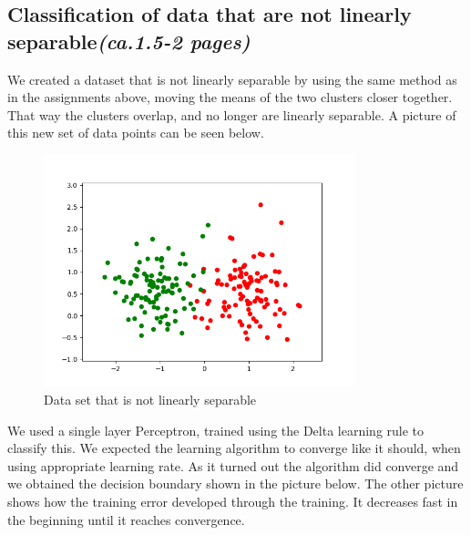 \documentclass[a4paper]{article}
\begin{document}
\subsection{Classification of data that are not linearly separable\textit{(ca.1.5-2 pages)}}
We created a dataset that is not linearly separable by using the same method as in the assignments above, moving the means of the two clusters closer together. That way the clusters overlap, and no longer are linearly separable. A picture of this new set of data points can be seen below.
\begin{figure}[htb]
    \centering
    \includegraphics[width=0.8\textwidth]{Labs/Lab 1/Lab 1a/Results/overlapping_dataset.png}
    \caption{Data set that is not linearly separable}
    \label{fig:enter-label}
\end{figure}
We used a single layer Perceptron, trained using the Delta learning rule to classify this. We expected the learning algorithm to converge like it should, when using appropriate learning rate. As it turned out the algorithm did converge and we obtained the decision boundary shown in the picture below. The other picture shows how the training error developed through the training. It decreases fast in the beginning until it reaches convergence.
\end{document}
